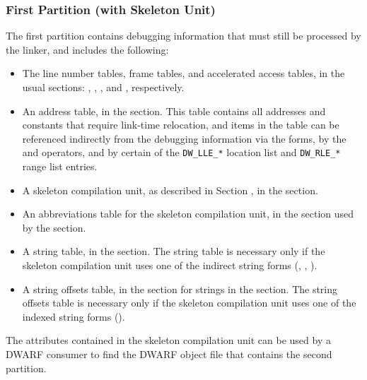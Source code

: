 \subsubsection{First Partition (with Skeleton Unit)}
The first partition contains
debugging information that must still be processed by the linker,
and includes the following:
\begin{itemize}
\item
The line number tables, frame tables, and
accelerated access tables, in the usual sections:
\dotdebugline, \dotdebuglinestr, 
\dotdebugframe, \dotdebugnames{} and \dotdebugaranges,
respectively.
\item
An address table, in the \dotdebugaddr{} section. This table
contains all addresses and constants that require
link-time relocation, and items in the table can be
referenced indirectly from the debugging information via
the \DWFORMaddrxXNand{} forms, 
by the \DWOPaddrx{} and \DWOPconstx{} operators, and
by certain of the \texttt{DW\_LLE\_*} location list
and \texttt{DW\_RLE\_*} range list entries.
\item
A skeleton compilation unit, as described in Section
, 
in the \dotdebuginfo{} section.
\item
An abbreviations table for the skeleton compilation unit,
in the \dotdebugabbrev{} section
used by the \dotdebuginfo{} section.

\item
A string table, in the \dotdebugstr{} section. The string
table is necessary only if the skeleton compilation unit
uses one of the indirect string forms (\DWFORMstrp{},
\bb
\DWFORMstrpeight{},
\eb 
\DWFORMstrxXNor).

\item
A string offsets table, in the \dotdebugstroffsets{}
section for strings in the \dotdebugstr{} section. 
The string offsets table is necessary only if
the skeleton compilation unit uses 
one of the indexed string forms (\DWFORMstrxXN).
\end{itemize}
The attributes contained in the skeleton compilation
unit can be used by a DWARF consumer to find the 
DWARF object file that contains the second partition.

